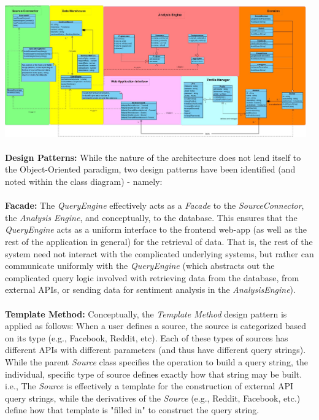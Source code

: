 \documentclass[12pt]{article}
\begin{document}
\includegraphics[width=13cm]{../../Images/classDiagram2.jpg}\\\\
\textbf{Design Patterns:} While the nature of the architecture does not lend itself to the Object-Oriented paradigm, two design patterns have been identified (and noted within the class diagram) - namely:\\\\
\textbf{Facade:} The \textit{QueryEngine} effectively acts as a \textit{Facade} to the \textit{SourceConnector}, the \textit{Analysis Engine}, and conceptually, to the database. This ensures that the \textit{QueryEngine} acts as a uniform interface to the frontend web-app (as well as the rest of the application in general) for the retrieval of data. That is, the rest of the system need not interact with the complicated underlying systems, but rather can communicate uniformly with the \textit{QueryEngine} (which abstracts out the complicated query logic involved with retrieving data from the database, from external APIs, or sending data for sentiment analysis in the \textit{AnalysisEngine}).\\\\
\textbf{Template Method:} Conceptually, the \textit{Template Method} design pattern is applied as follows: When a user defines a source, the source is categorized based on its type (e.g., Facebook, Reddit, etc). Each of these types of sources has different APIs with different parameters (and thus have different query strings). While the parent \textit{Source} class specifies the operation to build a query string, the individual, specific type of source defines exactly how that string may be built. i.e., The \textit{Source} is effectively a template for the construction of external API query strings, while the derivatives of the \textit{Source} (e.g., Reddit, Facebook, etc.) define how that template is "filled in" to construct the query string.
\end{document}
